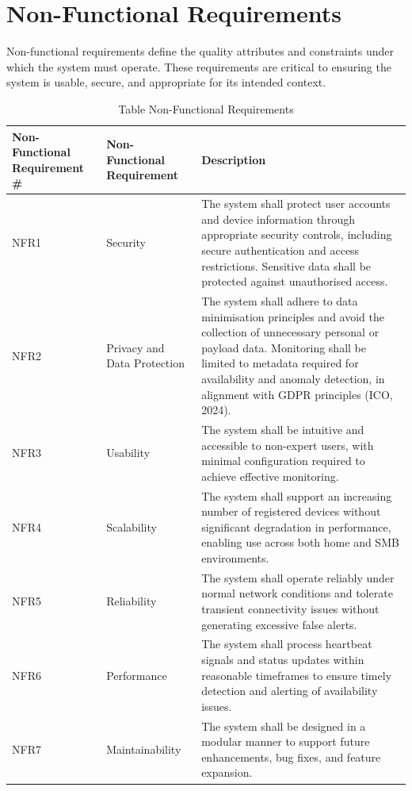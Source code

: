 \section{Non-Functional Requirements}

Non-functional requirements define the quality attributes and constraints under which the system must operate. These requirements are critical to ensuring the system is usable, secure, and appropriate for its intended context.

\begin{table}[htbp]
  \centering
  \small
  \caption{Table  Non-Functional Requirements}
  \label{tab:ica2_3}
\begin{tabular}{p{}p{}p{}}
\toprule
Non-Functional Requirement \# & Non-Functional Requirement & Description \\
\midrule
NFR1 & Security & The system shall protect user accounts and device information through appropriate security controls, including secure authentication and access restrictions. Sensitive data shall be protected against unauthorised access. \\
NFR2 & Privacy and Data Protection & The system shall adhere to data minimisation principles and avoid the collection of unnecessary personal or payload data. Monitoring shall be limited to metadata required for availability and anomaly detection, in alignment with GDPR principles (ICO, 2024). \\
NFR3 & Usability & The system shall be intuitive and accessible to non-expert users, with minimal configuration required to achieve effective monitoring. \\
NFR4 & Scalability & The system shall support an increasing number of registered devices without significant degradation in performance, enabling use across both home and SMB environments. \\
NFR5 & Reliability & The system shall operate reliably under normal network conditions and tolerate transient connectivity issues without generating excessive false alerts. \\
NFR6 & Performance & The system shall process heartbeat signals and status updates within reasonable timeframes to ensure timely detection and alerting of availability issues. \\
NFR7 & Maintainability & The system shall be designed in a modular manner to support future enhancements, bug fixes, and feature expansion. \\
\bottomrule
\end{tabular}
\end{table}

